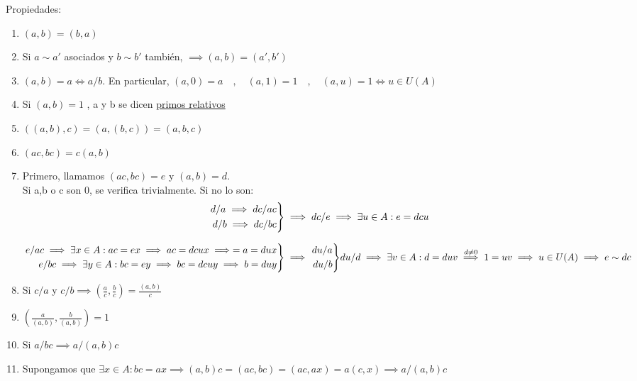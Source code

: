 \documentclass[11pt, a4paper, titlepage]{article}
\makeatletter
\renewenvironment{proof}[1][\proofname] {\vspace{-15pt}\par\pushQED{\qed}\normalfont\topsep6\p@\@plus6\p@\relax\trivlist\item[\hskip\labelsep\it#1\@addpunct{.}]\ignorespaces}{\popQED\endtrivlist\@endpefalse}
\theoremstyle{theorem-style}
\theoremstyle{definition-style}
\theoremstyle{remark-style}
\theoremstyle{example-style}
\newenvironment{nlist}
{\begin{enumerate}
\renewcommand\labelenumi{(\emph{\roman{enumi})}}}
{\end{enumerate}}
\newenvironment{rcases}
  {\left.\begin{aligned}}
  {\end{aligned}\right\rbrace}
\makeatother
\begin{document}
Propiedades:
\begin{nlist}

	\item $(a,b) = (b,a)$
	
	\item Si $a \sim a'$ asociados y $b \sim b'$ también, $\implies (a,b) = (a',b')$
	
	\item $(a,b) = a \iff a/b$. En particular, $(a,0) = a \quad , \quad (a,1) = 1 \quad, \quad (a,u) = 1 \iff u \in U(A)$
	
	\item Si $(a,b) = 1$ , a y b se dicen \underline{primos relativos}
	
	\item $((a,b),c) = (a,(b,c)) = (a,b,c)$
	\item $(ac,bc) = c(a,b)$\\
	\begin{proof}
	Primero, llamamos $(ac,bc) = e$ y $(a,b) = d$.\\
	Si a,b o c son 0, se verifica trivialmente. Si no lo son:\\
	\[
	\begin{rcases}
	d/a \implies dc/ac\\
	d/b \implies dc/bc\\
\end{rcases} \implies dc/e \implies \exists u \in A : e = dcu
	\]
	
	$\begin{rcases}e / ac \implies \exists x \in A : ac = ex \implies ac = dcux \implies = a = dux\\
	e/bc\implies \exists y \in A : bc = ey \implies bc = dcuy \implies b = duy\end{rcases} \implies \begin{rcases}du/a\\du/b\end{rcases} du/d \\\implies \exists v \in A : d = duv \stackrel{d\ne 0}{\implies} 1=uv \implies u\in U(A) \implies e \sim  dc$

	
\end{proof}

	\item Si $c/a$ y $c/b\implies (\frac{a}{c},\frac{b}{c}) =  \frac{(a,b)}{c}$
	
	\item
	$(\frac{a}{(a,b)}, \frac{b}{(a,b)}) = 1$
	
	\item Si $a/bc \implies a/(a,b)c$\\
	\begin{proof}
	Supongamos que $\exists x \in A : bc = ax  \implies (a,b)c = (ac,bc) = (ac,ax) = a(c,x) \implies a/(a,b)c$
	

\end{proof}
\end{nlist}
\end{document}
